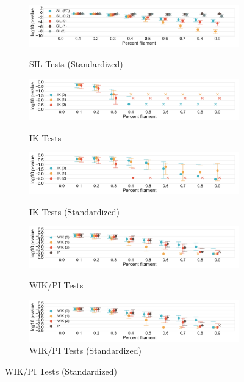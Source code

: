 \documentclass[12pt]{article}
\begin{document}
\begin{description}
\begin{center}
\begin{figure}[htp!]
\begin{subfigure}{.48\textwidth}
        \caption{SIL Tests (Standardized)}
        \includegraphics[width=\linewidth, height = .75in]{figure_8_all_silhouette_group_normed.pdf}
        \label{fig:all_silh_normed_normed}
      \end{subfigure}
      \begin{subfigure}{.48\textwidth}
        \centering
        \caption{IK Tests}
        \includegraphics[width=\linewidth, height = .75in]{figure_8_all_contour_group.pdf}
        \label{fig:all_contour}
      \end{subfigure}
      \begin{subfigure}{.48\textwidth}
        \centering
        \caption{IK Tests (Standardized)}
        \includegraphics[width=\linewidth, height = .75in]{figure_8_all_contour_group_normed.pdf}
        \label{fig:all_contour_normed}
      \end{subfigure}
      \begin{subfigure}{.48\textwidth}
        \centering
        \caption{WIK/PI Tests}
        \includegraphics[width=\linewidth, height = .75in]{figure_8_all_weighted_contour_group.pdf}
        \label{fig:all_weight}
      \end{subfigure}
      \begin{subfigure}{.48\textwidth}
        \centering
        \caption{WIK/PI Tests (Standardized)}
        \includegraphics[width=\linewidth, height = .75in]{figure_8_all_weighted_contour_group_normed.pdf}

\end{subfigure}
\end{figure}
\end{center}
\end{description}
\end{document}
